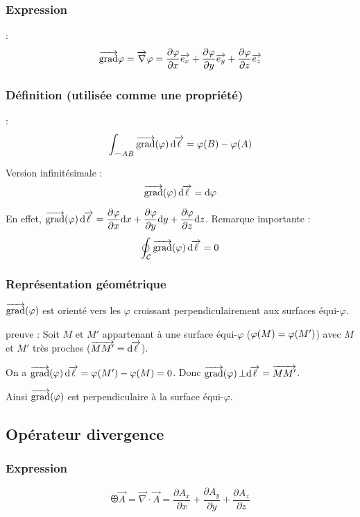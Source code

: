 \documentclass[a4paper,french,bookmarks]{book}
\begin{document}
    \subsubsection{Expression} :
    \[ \overrightarrow{\operatorname{grad}} \varphi = \overrightarrow{\nabla} \varphi = \dfrac{\partial \varphi}{\partial x} \overrightarrow{e_x} + \dfrac{\partial \varphi}{\partial y} \overrightarrow{e_y} +
    \dfrac{\partial \varphi}{\partial z} \overrightarrow{e_z}\]
    \subsubsection{Définition (utilisée comme une propriété)} :
    \[ \int_{\frown{AB}} \vec{\grad}\p{\varphi}  \dif\! \Vec{\ell} = \varphi\p{B} - \varphi\p{A}\]
    
    Version infinitésimale :
    \[ \vec{\grad}\p{\varphi} \dif\!\Vec{\ell} = \dif \varphi\]
    
    En effet, $\vec{\grad}\p{\varphi} \dif\!\Vec{\ell} = \dfrac{\partial \varphi}{\partial x}\dif x + \dfrac{\partial \varphi}{\partial y}\dif y +
    \dfrac{\partial \varphi}{\partial z}\dif z$. Remarque importante :
    \[ \oint_\bcC \vec{\grad}\p{\varphi} \dif\!\Vec{\ell} = 0\]
    
    \subsubsection{Représentation géométrique}
    
    $\Vec{\grad}\p{\varphi}$ est orienté vers les $\varphi$ croissant perpendiculairement aux surfaces équi-$\varphi$.
    
    preuve : Soit $M$ et $M'$ appartenant à une surface équi-$\varphi$ ($\varphi\!\left(M\right) = \varphi\!\left(M'\right)$) avec $M$ et $M'$ très proches ($\overrightarrow{MM'} = \mathrm d\!\overrightarrow{\ell}$).
    
    On a $\vec{\grad}\p{\varphi} \dif\!\Vec{\ell} = \varphi\p{M'} - \varphi\p{M} = 0$. Donc $\overrightarrow{\operatorname{grad}}\!\left(\varphi\right) \bot \mathrm d\!\overrightarrow{\ell} = \overrightarrow{MM'}$.
    
    Ainsi $\overrightarrow{\operatorname{grad}}\!\left(\varphi\right)$ est perpendiculaire à la surface équi-$\varphi$.
    
    \subsection{Opérateur divergence} 
    
    \subsubsection{Expression}
    \[ \odiv \vec{A} = \vec{\nabla} \cdot \vec{A} = \dfrac{\partial A_x}{\partial x} + \dfrac{\partial A_y}{\partial y} + \dfrac{\partial A_z}{\partial z}\]
    
\end{document}

